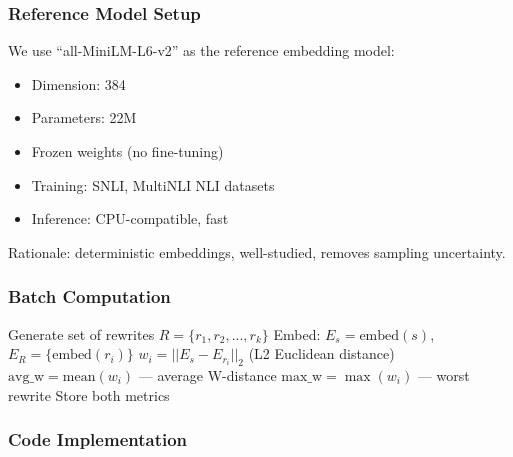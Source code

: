 \documentclass[12pt,a4paper,oneside]{report}
\begin{document}
\subsubsection{Reference Model Setup}

We use ``all-MiniLM-L6-v2'' as the reference embedding model:

\begin{itemize}
    \item Dimension: 384
    \item Parameters: 22M
    \item Frozen weights (no fine-tuning)
    \item Training: SNLI, MultiNLI NLI datasets
    \item Inference: CPU-compatible, fast
\end{itemize}

Rationale: deterministic embeddings, well-studied, removes sampling uncertainty.

\subsubsection{Batch Computation}

\begin{algorithm}
\caption{Wasserstein Distance Computation}
\begin{algorithmic}
    \State Generate set of rewrites $R = \{r_1, r_2, ..., r_k\}$
    \State Embed: $E_s = \text{embed}(s)$, $E_R = \{\text{embed}(r_i)\}$
        \State $w_i = ||E_s - E_{r_i}||_2$ (L2 Euclidean distance)
    \EndFor
    \State $\text{avg\_w} = \text{mean}(w_i)$ — average W-distance
    \State $\text{max\_w} = \max(w_i)$ — worst rewrite
    \State Store both metrics
\EndFor
\end{algorithmic}
\end{algorithm}

\subsubsection{Code Implementation}
\end{document}
